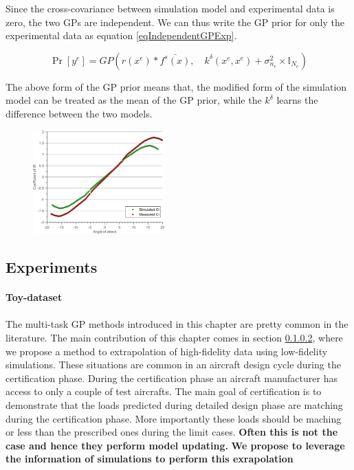 Since the cross-covariance between simulation model and experimental data is zero, the two GPs are independent. We can thus write the GP prior for only the experimental data as equation \ref{eqIndependentGPExp}.

\begin{equation}\label{eqIndependentGPExp}
\Pr[y^{e}] = GP \left( r(x^{e})*\bar{f^{s}(x)}, \quad k^{\delta}(x^{e}, x^{e}) + \sigma_{n_{e}}^2 \times \mathbb{I}_{N_{e}} \right)
\end{equation}

The above form of the GP prior means that, the modified form of the simulation model can be treated as the mean of the GP prior, while the $k^{\delta}$ learns the difference between the two models. 


\begin{figure}[!ht]
  \centering
    \includegraphics[width=0.45\textwidth]
        {images/part3/measuredVssimulatedCl}
        \label{subFigmeasuredVssimulatedCl}
       \caption{}
\end{figure}
\subsection{Experiments}

\paragraph{Toy-dataset}

\paragraph{}
The multi-task GP methods introduced in this chapter are pretty common in the literature. The main contribution of this chapter comes in section \ref{}, where we propose a method to extrapolation of high-fidelity data using low-fidelity simulations. These situations are common in an aircraft design cycle during the certification phase. During the certification phase an aircraft manufacturer has access to only a couple of test aircrafts. The main goal of certification is to demonstrate that the loads predicted during detailed design phase are matching during the certification phase. More importantly these loads should be maching or less than the prescribed ones during the limit cases. 
\textbf{Often this is not the case and hence they perform model updating.}
\textbf{We propose to leverage the information of simulations to perform this exrapolation}

